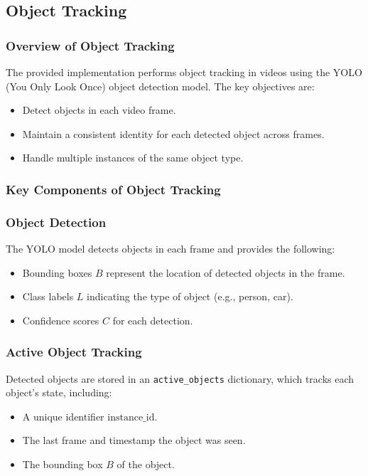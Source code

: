 \documentclass[conference]{IEEEtran}
\begin{document}
\subsection{Object Tracking}
\subsubsection{Overview of Object Tracking}
The provided implementation performs object tracking in videos using the YOLO (You Only Look Once) object detection model. The key objectives are:
\begin{itemize}
    \item Detect objects in each video frame.
    \item Maintain a consistent identity for each detected object across frames.
    \item Handle multiple instances of the same object type.
\end{itemize}

\subsubsection{Key Components of Object Tracking}

\subsubsection{Object Detection}
The YOLO model detects objects in each frame and provides the following:
\begin{itemize}
    \item Bounding boxes $B$ represent the location of detected objects in the frame.
    \item Class labels $L$ indicating the type of object (e.g., person, car).
    \item Confidence scores $C$ for each detection.
\end{itemize}

\subsubsection{Active Object Tracking}
Detected objects are stored in an \texttt{active\_objects} dictionary, which tracks each object’s state, including:
\begin{itemize}
    \item A unique identifier $\text{instance\_id}$.
    \item The last frame and timestamp the object was seen.
    \item The bounding box $B$ of the object.
\end{itemize}
\end{document}

